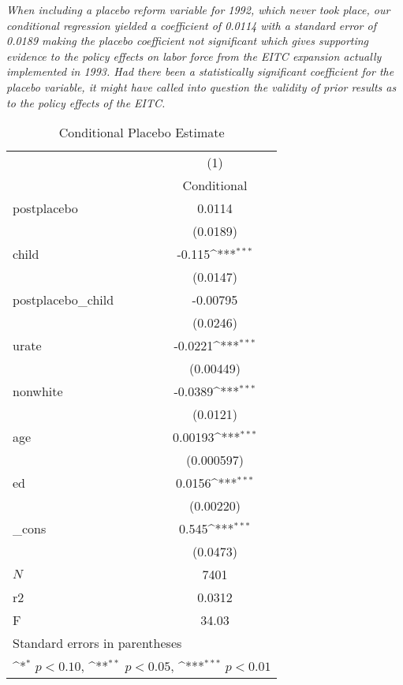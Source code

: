 \documentclass{article}
\begin{document}
\begin{enumerate}
\textit{  When including a placebo reform variable for 1992, which never took place, our conditional regression yielded a coefficient of 0.0114 with a standard error of 0.0189 making the placebo coefficient not significant which gives supporting evidence to the policy effects on labor force from the EITC expansion actually implemented in 1993. Had there been a statistically significant coefficient for the placebo variable, it might have called into question the validity of prior results as to the policy effects of the EITC.  }


\begin{table}[htbp]\centering
	\def\sym#1{\ifmmode^{#1}\else\(^{#1}\)\fi}
	\caption{Conditional Placebo Estimate}
	\begin{tabular}{l*{1}{c}}
		\hline\hline
		&\multicolumn{1}{c}{(1)}\\
		&\multicolumn{1}{c}{Conditional}\\
		\hline
		postplacebo &      0.0114         \\
		&    (0.0189)         \\
		[1em]
		child       &      -0.115\sym{***}\\
		&    (0.0147)         \\
		[1em]
		postplacebo\_child&    -0.00795         \\
		&    (0.0246)         \\
		[1em]
		urate       &     -0.0221\sym{***}\\
		&   (0.00449)         \\
		[1em]
		nonwhite    &     -0.0389\sym{***}\\
		&    (0.0121)         \\
		[1em]
		age         &     0.00193\sym{***}\\
		&  (0.000597)         \\
		[1em]
		ed          &      0.0156\sym{***}\\
		&   (0.00220)         \\
		[1em]
		\_cons      &       0.545\sym{***}\\
		&    (0.0473)         \\
		\hline
		\(N\)       &        7401         \\
		r2          &      0.0312         \\
		F           &       34.03         \\
		\hline\hline
		\multicolumn{2}{l}{\footnotesize Standard errors in parentheses}\\
		\multicolumn{2}{l}{\footnotesize \sym{*} \(p<0.10\), \sym{**} \(p<0.05\), \sym{***} \(p<0.01\)}\\
	\end{tabular}
\end{table}







\end{enumerate}
\end{document}
